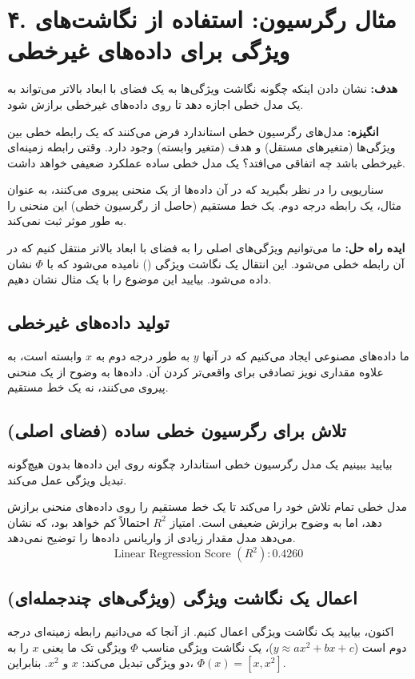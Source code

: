\documentclass{article}
\begin{document}
\section*{۴. مثال رگرسیون: استفاده از نگاشت‌های ویژگی برای داده‌های غیرخطی}
\textbf{هدف:} نشان دادن اینکه چگونه نگاشت ویژگی‌ها به یک فضای با ابعاد بالاتر می‌تواند به یک مدل خطی اجازه دهد تا روی داده‌های غیرخطی برازش شود.

\textbf{انگیزه:} مدل‌های رگرسیون خطی استاندارد فرض می‌کنند که یک رابطه خطی بین ویژگی‌ها (متغیرهای مستقل) و هدف (متغیر وابسته) وجود دارد. وقتی رابطه زمینه‌ای غیرخطی باشد چه اتفاقی می‌افتد؟ یک مدل خطی ساده عملکرد ضعیفی خواهد داشت.

سناریویی را در نظر بگیرید که در آن داده‌ها از یک منحنی پیروی می‌کنند، به عنوان مثال، یک رابطه درجه دوم. یک خط مستقیم (حاصل از رگرسیون خطی) این منحنی را به طور موثر ثبت نمی‌کند.

\textbf{ایده راه حل:} ما می‌توانیم ویژگی‌های اصلی را به فضای با ابعاد بالاتر منتقل کنیم که در آن رابطه خطی می‌شود. این انتقال یک نگاشت ویژگی () نامیده می‌شود که با $\Phi$ نشان داده می‌شود. بیایید این موضوع را با یک مثال نشان دهیم.

\subsection*{تولید داده‌های غیرخطی}
ما داده‌های مصنوعی ایجاد می‌کنیم که در آنها $y$ به طور درجه دوم به $x$ وابسته است، به علاوه مقداری نویز تصادفی برای واقعی‌تر کردن آن. داده‌ها به وضوح از یک منحنی پیروی می‌کنند، نه یک خط مستقیم.

\subsection*{تلاش برای رگرسیون خطی ساده (فضای اصلی)}
بیایید ببینیم یک مدل رگرسیون خطی استاندارد چگونه روی این داده‌ها بدون هیچ‌گونه تبدیل ویژگی عمل می‌کند.

مدل خطی تمام تلاش خود را می‌کند تا یک خط مستقیم را روی داده‌های منحنی برازش دهد، اما به وضوح برازش ضعیفی است. امتیاز $R^2$ احتمالاً کم خواهد بود، که نشان می‌دهد مدل مقدار زیادی از واریانس داده‌ها را توضیح نمی‌دهد.
\[
\text{Linear Regression Score } (R^2): 0.4260
\]

\subsection*{اعمال یک نگاشت ویژگی (ویژگی‌های چندجمله‌ای)}
اکنون، بیایید یک نگاشت ویژگی اعمال کنیم. از آنجا که می‌دانیم رابطه زمینه‌ای درجه دوم است ($y \approx a x^2 + b x + c$)، یک نگاشت ویژگی مناسب $\Phi$ ویژگی تک ما یعنی $x$ را به دو ویژگی تبدیل می‌کند: $x$ و $x^2$. بنابراین، $\Phi(x) = [x, x^2]$.
\end{document}
